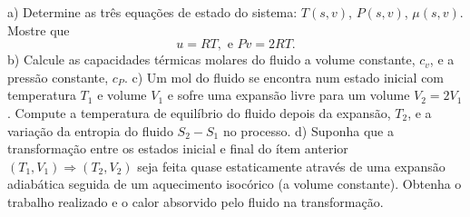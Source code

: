 \begin{enumerate}[start=1,label={\bfseries Q\arabic*.}]
a) Determine as três equações de estado do sistema: $T(s,v )$, $P(s,v)$, $\mu(s,v)$. Mostre que
$$
u=RT, \mbox{ e } Pv = 2RT.
$$
b) Calcule as capacidades térmicas molares do ﬂuido a volume constante, $c_{v}$, e a pressão constante, $c_{P}$.
c) Um mol do ﬂuido se encontra num estado inicial com temperatura $T_{1}$ e volume $V_{1}$ e sofre uma expansão livre para um volume $V_{2}= 2V_{1}$. Compute a temperatura de equilíbrio do ﬂuido depois da expansão, $T_{2}$, e a variação da entropia do ﬂuido $S_{2}-S_{1}$ no processo.
d) Suponha que a transformação entre os estados inicial e ﬁnal do ítem anterior $(T_{1},V_{1}) \Rightarrow (T_{2},V_{2})$ seja feita quase estaticamente através de uma expansão adiabática seguida de um aquecimento isocórico (a volume constante). Obtenha o trabalho realizado e o calor absorvido pelo ﬂuido na transformação.





\end{enumerate}






